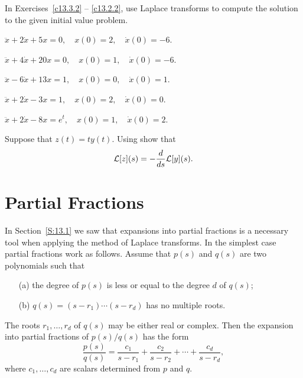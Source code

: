 \documentclass{ximera}
\begin{document}
\noindent In Exercises~\ref{c13.3.2} -- \ref{c13.2.2}, use Laplace transforms 
to compute the solution to the given initial value problem.
\begin{exercise} \label{c13.3.2}
$\ddot{x} + 2\dot x +5x = 0, \quad x(0) = 2, \quad \dot{x}(0) = -6$.
\end{exercise}
\begin{exercise} \label{c13.4.3a}
$\ddot x +4\dot x +20 x=0,\quad x(0)=1,\quad \dot{x}(0)=-6$.
\end{exercise}
\begin{exercise} \label{c13.4.3b}
$\ddot x -6\dot x +13 x=1,\quad x(0)=0,\quad \dot{x}(0)=1$.
\end{exercise}
\begin{exercise} \label{c13.2.1}
$\ddot{x} + 2\dot{x} - 3x  =  1, \quad x(0) = 2, \quad \dot{x}(0) = 0$.
\end{exercise}
\begin{exercise} \label{c13.2.2}
$\ddot{x} + 2\dot{x} - 8x = e^t, \quad x(0) = 1, \quad \dot{x}(0) = 2$.
\end{exercise}

\begin{exercise} \label{c13.1.2}
Suppose that $z(t)=ty(t)$.  Using  show that
\[
{\cal L}[z](s) = -\frac{\displaystyle d}{\displaystyle ds} {\cal L}[y](s).
\]
\end{exercise}


\section{Partial Fractions}  \label{S:PF}

In Section~\ref{S:13.1} we saw that expansions into partial fractions is a 
necessary tool when applying the method of Laplace transforms.  In the
simplest case partial fractions work as follows.  Assume that $p(s)$ and 
$q(s)$ are two polynomials such that
\begin{enumerate}
\item[(a)] the degree of $p(s)$ is less or equal to the degree $d$ of $q(s)$;
\item[(b)] $q(s)=(s-r_1)\cdots(s-r_d)$ has no multiple roots.
\end{enumerate}
The roots $r_1,\ldots,r_d$ of $q(s)$ may be either real or complex.  Then the 
expansion into partial fractions of $p(s)/q(s)$ has the form
\begin{equation}  \label{E:PF}
\frac{p(s)}{q(s)} = \frac{c_1}{s-r_1}+\frac{c_2}{s-r_2}+\cdots
+\frac{c_d}{s-r_d},
\end{equation}
where $c_1,\ldots,c_d$ are  scalars determined from $p$ and $q$.
\end{document}
